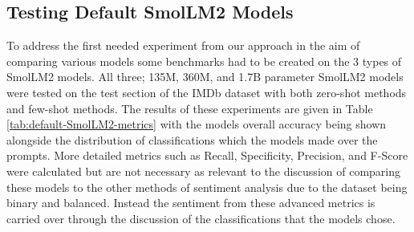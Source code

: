 \documentclass[10pt,twocolumn,letterpaper]{article}
\begin{document}
\subsection{Testing Default SmolLM2 Models}
To address the first needed experiment from our approach in the aim of comparing various models some benchmarks had to be created on the 3 types of SmolLM2 models. All three; 135M, 360M, and 1.7B parameter  SmolLM2 models were tested on the test section of the IMDb dataset \cite{IMDB-dataset} with both zero-shot methods and few-shot methods. The results of these experiments are given in Table \ref{tab:default-SmolLM2-metrics} with the models overall accuracy being shown alongside the distribution of classifications which the models made over the prompts. More detailed metrics such as Recall, Specificity, Precision, and F-Score were calculated but are not necessary as relevant to the discussion of comparing these models to the other methods of sentiment analysis due to the dataset being binary and balanced. Instead the sentiment from these advanced metrics is carried over through the discussion of the classifications that the models chose. 






\end{document}
